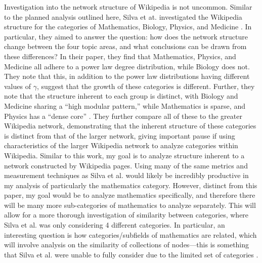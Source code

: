 \documentclass[10pt]{paper}
\begin{document}
Investigation into the network structure of Wikipedia is not uncommon. Similar to the planned analysis outlined here, Silva et at. investigated the Wikipedia structure for the categories of Mathematics, Biology, Physics, and Medicine \cite{silva2011investigating}. 
In particular, they aimed to answer the question: how does the network structure change between the four topic areas, and what conclusions can be drawn from these differences? In their paper, they find that Mathematics, Physics, and Medicine all adhere to a power law degree distribution, while Biology does not. They note that this, in addition to the power law distributions having different values of $\gamma$, suggest that the growth of these categories is different. 
Further, they note that the structure inherent to each group is distinct, with Biology and Medicine sharing a ``high modular pattern,'' while Mathematics is sparse, and Physics has a ``dense core'' \cite{silva2011investigating}. They further compare all of these to the greater Wikipedia network, demonstrating that the inherent structure of these categories is distinct from that of the larger network, giving important pause if using characteristics of the larger Wikipedia network to analyze categories within Wikipedia. 
Similar to this work, my goal is to analyze structure inherent to a network constructed by Wikipedia pages. Using many of the same metrics and measurement techniques as Silva et al. would likely be incredibly productive in my analysis of particularly the mathematics category. 
However, distinct from this paper, my goal would be to analyze mathematics specifically, and therefore there will be many more sub-categories of mathematics to analyze separately. This will allow for a more thorough investigation of similarity between categories, where Silva et al. was only considering 4 different categories. 
In particular, an interesting question is how categories/subfields of mathematics are related, which will involve analysis on the similarity of collections of nodes---this is something that Silva et al. were unable to fully consider due to the limited set of categories \cite{silva2011investigating}. 
\end{document}
